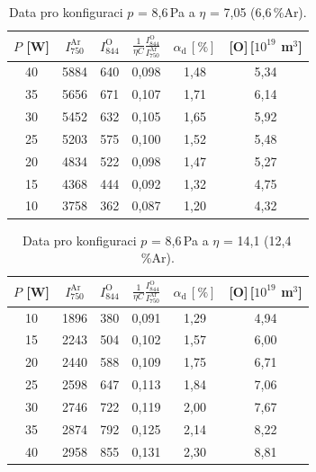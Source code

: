\documentclass[12pt]{article}
\begin{document}
\begin{table}[htbp]
\begin{center}
\begin{tabular}{|c|c|c|c|c|c|}
\hline
$P$ [W] & $I_{750}^\mathrm{Ar}$ & $I_{844}^\mathrm{O}$ & $\frac{1}{\eta C}\frac{I_{844}^\mathrm{O}}{I_{750}^\mathrm{Ar}}$ & $\alpha_\mathrm{d}\,[\%]$ & [O]\,[$10^{19}$ m$^3$] \\ \hline
40 & 5884 & 640 & 0,098 & 1,48 & 5,34 \\ \hline
35 & 5656 & 671 & 0,107 & 1,71 & 6,14 \\ \hline
30 & 5452 & 632 & 0,105 & 1,65 & 5,92 \\ \hline
25 & 5203 & 575 & 0,100 & 1,52 & 5,48 \\ \hline
20 & 4834 & 522 & 0,098 & 1,47 & 5,27 \\ \hline
15 & 4368 & 444 & 0,092 & 1,32 & 4,75 \\ \hline
10 & 3758 & 362 & 0,087 & 1,20 & 4,32 \\ \hline
\end{tabular}
\caption{Data pro konfiguraci $p$ = 8,6\,Pa a $\eta$ = 7,05 (6,6\,\%Ar).}
\label{k1}
\end{center}
\end{table}

\begin{table}[htbp]
\begin{center}
\begin{tabular}{|c|c|c|c|c|c|}
\hline
$P$ [W] & $I_{750}^\mathrm{Ar}$ & $I_{844}^\mathrm{O}$ & $\frac{1}{\eta C}\frac{I_{844}^\mathrm{O}}{I_{750}^\mathrm{Ar}}$ & $\alpha_\mathrm{d}\,[\%]$ & [O]\,[$10^{19}$ m$^3$] \\ \hline
10 & 1896 & 380 & 0,091 & 1,29 & 4,94 \\ \hline
15 & 2243 & 504 & 0,102 & 1,57 & 6,00 \\ \hline
20 & 2440 & 588 & 0,109 & 1,75 & 6,71 \\ \hline
25 & 2598 & 647 & 0,113 & 1,84 & 7,06 \\ \hline
30 & 2746 & 722 & 0,119 & 2,00 & 7,67 \\ \hline
35 & 2874 & 792 & 0,125 & 2,14 & 8,22 \\ \hline
40 & 2958 & 855 & 0,131 & 2,30 & 8,81 \\ \hline
\end{tabular}
\end{center}
\caption{Data pro konfiguraci $p$ = 8,6\,Pa a $\eta$ = 14,1 (12,4\,\%Ar).}
\label{k2}
\end{table}
\end{document}
